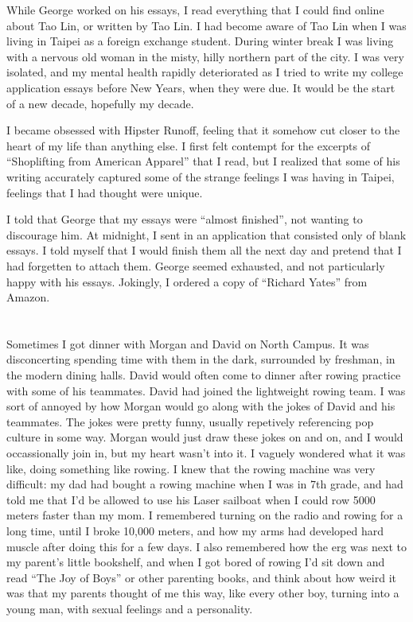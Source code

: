 While George worked on his essays, I read everything that I could find online
about Tao Lin, or written by Tao Lin.  I had become aware of  Tao Lin when I was
living in Taipei as a foreign exchange student.  During winter break I was
living with a nervous old woman in the misty, hilly northern part of the city.
I was very isolated, and my mental health rapidly deteriorated as I tried to
write my college application essays before New Years, when they were due.  It
would be the start of a new decade, hopefully my decade.

I became obsessed with Hipster Runoff, feeling that it somehow cut closer to the
heart of my life than anything else.  I first felt contempt for the excerpts of
``Shoplifting from American Apparel'' that I read, but I realized that some of his
writing accurately captured some of the strange feelings I was having in Taipei,
feelings that I had thought were unique.

I told that George that my essays were ``almost finished'', not wanting to
discourage him.  At midnight, I sent in an application that consisted only of
blank essays.  I told myself that I would finish them all the next day and
pretend that I had forgetten to attach them.  George seemed exhausted, and not
particularly happy with his essays.  Jokingly, I ordered a copy of ``Richard
Yates'' from Amazon.

\section{}

Sometimes I got dinner with Morgan and David on North Campus.  It was
disconcerting spending time with them in the dark, surrounded by freshman, in
the modern dining halls.  David would often come to dinner after rowing practice
with some of his teammates.  David had joined the lightweight rowing team.  I
was sort of annoyed by how Morgan would go along with the jokes of David and his
teammates.  The jokes were pretty funny, usually repetively referencing pop
culture in some way.  Morgan would just draw these jokes on and on, and I would
occassionally join in, but my heart wasn't into it.  I vaguely wondered what it
was like, doing something like rowing.  I knew that the rowing machine was very
difficult: my dad had bought a rowing machine when I was in 7th grade,
and had told me that I'd be allowed to use his Laser sailboat when I could row
5000 meters faster than my mom.  I remembered turning on the radio and rowing
for a long time, until I broke 10,000 meters, and how my arms had developed hard
muscle after doing this for a few days.  I also remembered how the erg was next
to my parent's little bookshelf, and when I got bored of rowing I'd sit down and
read ``The Joy of Boys'' or other parenting books, and think about how weird it
was that my parents thought of me this way, like every other boy, turning into a
young man, with sexual feelings and a personality.  

